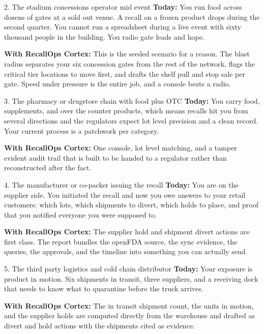 \documentclass[11pt]{article}
\begin{document}
\begin{usecase}{2. The stadium concessions operator mid event}
\textbf{Today:} You run food across dozens of gates at a sold out venue. A recall on a frozen
product drops during the second quarter. You cannot run a spreadsheet during a live event with
sixty thousand people in the building. You radio gate leads and hope.

\textbf{With RecallOps Cortex:} This is the seeded scenario for a reason. The blast radius
separates your six concession gates from the rest of the network, flags the critical tier
locations to move first, and drafts the shelf pull and stop sale per gate. Speed under pressure is
the entire job, and a console beats a radio.
\end{usecase}

\begin{usecase}{3. The pharmacy or drugstore chain with food plus OTC}
\textbf{Today:} You carry food, supplements, and over the counter products, which means recalls hit
you from several directions and the regulators expect lot level precision and a clean record. Your
current process is a patchwork per category.

\textbf{With RecallOps Cortex:} One console, lot level matching, and a tamper evident audit trail
that is built to be handed to a regulator rather than reconstructed after the fact.
\end{usecase}

\begin{usecase}{4. The manufacturer or co-packer issuing the recall}
\textbf{Today:} You are on the supplier side. You initiated the recall and now you owe answers to
your retail customers: which lots, which shipments to divert, which holds to place, and proof that
you notified everyone you were supposed to.

\textbf{With RecallOps Cortex:} The supplier hold and shipment divert actions are first class. The
report bundles the openFDA source, the sync evidence, the queries, the approvals, and the timeline
into something you can actually send.
\end{usecase}

\begin{usecase}{5. The third party logistics and cold chain distributor}
\textbf{Today:} Your exposure is product in motion. Six shipments in transit, three suppliers,
and a receiving dock that needs to know what to quarantine before the truck arrives.

\textbf{With RecallOps Cortex:} The in transit shipment count, the units in motion, and the
supplier holds are computed directly from the warehouse and drafted as divert and hold actions
with the shipments cited as evidence.
\end{usecase}
\end{document}
